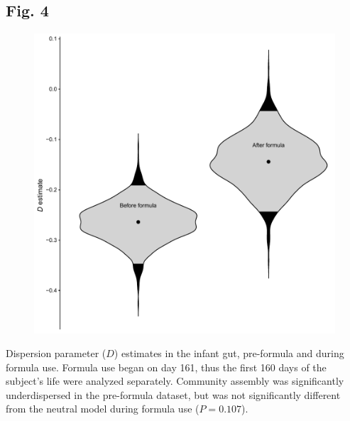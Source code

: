 \documentclass{article}
\begin{document}
{\subsection{Fig. 4}\label{sec:figure4}
\begin{figure}[ht]
	\centering
	\includegraphics[scale=0.80]{figs/Fig_4.pdf}
\end{figure}
Dispersion parameter (\(D\)) estimates in the infant gut, pre-formula and during formula use. Formula use began on day 161, thus the first 160 days of the subject's life were analyzed separately. Community assembly was significantly underdispersed in the pre-formula dataset, but was not significantly different from the neutral model during formula use (\(P = 0.107\)).
\newpage

}%




\newpage
\end{document}
